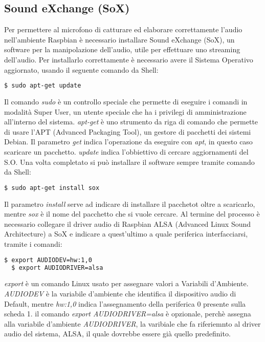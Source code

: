 \subsection{Sound eXchange (SoX)}
Per permettere al microfono di catturare ed elaborare correttamente l'audio nell'ambiente
Raspbian è necessario installare Sound eXchange (SoX), un software per la manipolazione
dell'audio, utile per effettuare uno streaming dell'audio.
Per installarlo correttamente è necessario avere il Sistema Operativo aggiornato,
usando il seguente comando da Shell:
\begin{lstlisting}[language=bash]
  $ sudo apt-get update
\end{lstlisting}
Il comando \textit{sudo} è un controllo speciale che permette di eseguire i comandi in modalità
Super User, un utente speciale che ha i privilegi di amministrazione all'interno del sistema.
\textit{apt-get} è uno strumento da riga di comando che permette di usare l'APT (Advanced Packaging Tool),
un gestore di pacchetti dei sistemi Debian.
Il parametro \textit{get} indica l'operazione da eseguire con \textit{apt}, in questo caso scaricare
un pacchetto.
\textit{update} indica l'obbiettivo di cercare aggiornamenti del S.O.
Una volta completato si può installare il software sempre tramite comando da Shell:
\begin{lstlisting}[language=bash]
  $ sudo apt-get install sox
\end{lstlisting}
Il parametro \textit{install} serve ad indicare di installare il pacchetot oltre a scaricarlo, mentre \textit{sox}
è il nome del pacchetto che si vuole cercare.
Al termine del processo è necessario collegare il driver audio di Raspbian ALSA (Advanced Linux Sound Architecture)
a SoX e indicare a quest'ultimo a quale periferica interfacciarsi, tramite i comandi:
\begin{lstlisting}[language=bash]
  $ export AUDIODEV=hw:1,0
  $ export AUDIODRIVER=alsa
\end{lstlisting}
\textit{export} è un comando Linux usato per assegnare valori a Variabili d'Ambiente.
\textit{AUDIODEV} è la variabile d'ambiente che identifica il dispositivo audio di Default, mentre
\textit{hw:1,0} indica l'assegnamento della periferica 0 presente sulla scheda 1.
il comando \textit{export AUDIODRIVER=alsa} è opzionale, perchè assegna alla variabile d'ambiente
\textit{AUDIODRIVER}, la varibiale che fa riferiemnto al driver audio del sistema, ALSA,
il quale dovrebbe essere già quello predefinito.

